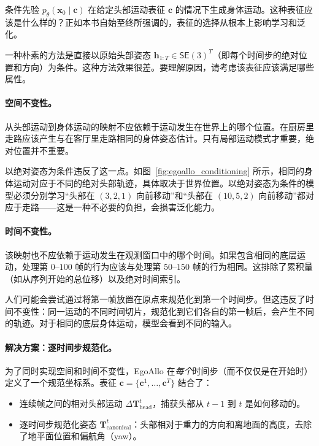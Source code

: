 \documentclass[../../book-main_zh.tex]{subfiles}
\begin{document}
条件先验 $p_\theta(\boldsymbol{x}_0 \mid \boldsymbol{c})$ 在给定头部运动表征 $\boldsymbol{c}$ 的情况下生成身体运动。这种表征应该是什么样的？正如本书自始至终所强调的，表征的选择从根本上影响学习和泛化。

一种朴素的方法是直接以原始头部姿态 $\boldsymbol{h}_{1:T} \in \mathsf{SE}(3)^T$（即每个时间步的绝对位置和方向）为条件。这种方法效果很差。要理解原因，请考虑该表征应该满足哪些属性。

\paragraph{空间不变性。}
从头部运动到身体运动的映射不应依赖于运动发生在世界上的哪个位置。在厨房里走路应该产生与在客厅里走路相同的身体姿态估计。只有局部运动模式才重要，绝对位置并不重要。

以绝对姿态为条件违反了这一点。如图~\ref{fig:egoallo_conditioning} 所示，相同的身体运动对应于不同的绝对头部轨迹，具体取决于世界位置。以绝对姿态为条件的模型必须分别学习“头部在 $(3,2,1)$ 向前移动”和“头部在 $(10,5,2)$ 向前移动”都对应于走路——这是一种不必要的负担，会损害泛化能力。

\paragraph{时间不变性。}
该映射也不应依赖于运动发生在观测窗口中的哪个时间。如果包含相同的底层运动，处理第 $0$--$100$ 帧的行为应该与处理第 $50$--$150$ 帧的行为相同。这排除了累积量（如从序列开始的总位移）以及绝对时间索引。

人们可能会尝试通过将第一帧放置在原点来规范化到第一个时间步。但这违反了时间不变性：同一运动的不同时间切片，规范化到它们各自的第一帧后，会产生不同的轨迹。对于相同的底层身体运动，模型会看到不同的输入。

\paragraph{解决方案：逐时间步规范化。}
为了同时实现空间和时间不变性，EgoAllo 在\emph{每个}时间步（而不仅仅是在开始时）定义了一个规范坐标系。表征 $\boldsymbol{c} = \{\boldsymbol{c}^{1}, \dots,
\boldsymbol{c}^{T}\}$ 结合了：
\begin{itemize}
    \item 连续帧之间的相对头部运动 $\Delta\boldsymbol{T}_{\text{head}}^{t}$，捕获头部从 $t-1$ 到 $t$ 是如何移动的。
    \item 逐时间步规范化姿态
        $\boldsymbol{T}_{\text{canonical}}^{t}$：头部相对于重力的方向和离地面的高度，去除了地平面位置和偏航角（yaw）。
\end{itemize}
\end{document}
